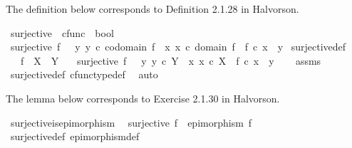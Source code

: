 \begin{isabellebody}
\begin{isamarkuptext}
The definition below corresponds to Definition 2.1.28 in Halvorson.%
\end{isamarkuptext}\isamarkuptrue%
\isamarkupfalse%
\ surjective\ {\isacharcolon}{\kern0pt}{\isacharcolon}{\kern0pt}\ {\isachardoublequoteopen}cfunc\ {\isasymRightarrow}\ bool{\isachardoublequoteclose}\ \isanewline
\ {\isachardoublequoteopen}surjective\ f\ \ {\isasymlongleftrightarrow}\ {\isacharparenleft}{\kern0pt}{\isasymforall}y{\isachardot}{\kern0pt}\ y\ {\isasymin}\isactrlsub c\ codomain\ f\ {\isasymlongrightarrow}\ {\isacharparenleft}{\kern0pt}{\isasymexists}x{\isachardot}{\kern0pt}\ x\ {\isasymin}\isactrlsub c\ domain\ f\ {\isasymand}\ f\ {\isasymcirc}\isactrlsub c\ x\ {\isacharequal}{\kern0pt}\ y{\isacharparenright}{\kern0pt}{\isacharparenright}{\kern0pt}{\isachardoublequoteclose}\isanewline
\isanewline
{}\isamarkupfalse%
\ surjective{\isacharunderscore}{\kern0pt}def{}{\isacharcolon}{\kern0pt}\isanewline
\ \ \ {\isachardoublequoteopen}f\ {\isacharcolon}{\kern0pt}\ X\ {\isasymrightarrow}\ Y{\isachardoublequoteclose}\isanewline
\ \ \ {\isachardoublequoteopen}surjective\ f\ \ {\isasymlongleftrightarrow}\ {\isacharparenleft}{\kern0pt}{\isasymforall}y{\isachardot}{\kern0pt}\ y\ {\isasymin}\isactrlsub c\ Y\ {\isasymlongrightarrow}\ {\isacharparenleft}{\kern0pt}{\isasymexists}x{\isachardot}{\kern0pt}\ x\ {\isasymin}\isactrlsub c\ X\ {\isasymand}\ f\ {\isasymcirc}\isactrlsub c\ x\ {\isacharequal}{\kern0pt}\ y{\isacharparenright}{\kern0pt}{\isacharparenright}{\kern0pt}{\isachardoublequoteclose}\isanewline
%
\isadelimproof
\ \ %
\endisadelimproof
%
\isatagproof
{}\isamarkupfalse%
\ assms\ \isamarkupfalse%
\ surjective{\isacharunderscore}{\kern0pt}def\ cfunc{\isacharunderscore}{\kern0pt}type{\isacharunderscore}{\kern0pt}def\ \isamarkupfalse%
\ auto%
\endisatagproof
{\isafoldproof}%
%
\isadelimproof
%
\endisadelimproof
%
\begin{isamarkuptext}%
The lemma below corresponds to Exercise 2.1.30 in Halvorson.%
\end{isamarkuptext}\isamarkuptrue%
\isamarkupfalse%
\ surjective{\isacharunderscore}{\kern0pt}is{\isacharunderscore}{\kern0pt}epimorphism{\isacharcolon}{\kern0pt}\isanewline
\ \ {\isachardoublequoteopen}surjective\ f\ {\isasymLongrightarrow}\ epimorphism\ f{\isachardoublequoteclose}\isanewline
%
\isadelimproof
\ \ %
\endisadelimproof
%
\isatagproof
{}\isamarkupfalse%
\ surjective{\isacharunderscore}{\kern0pt}def\ epimorphism{\isacharunderscore}{\kern0pt}def\isanewline

\end{isabellebody}
